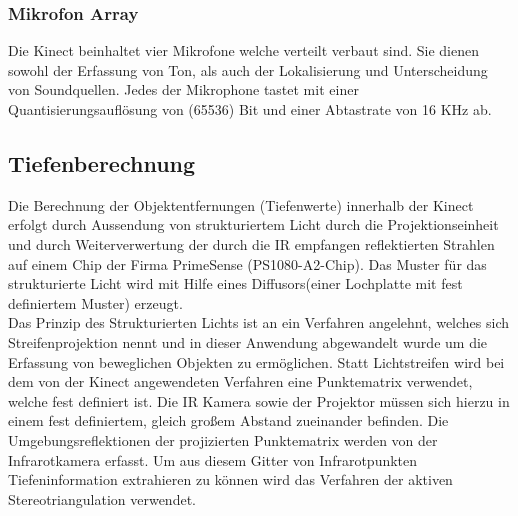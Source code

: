 \subsubsection{Mikrofon Array}
Die Kinect beinhaltet vier Mikrofone welche verteilt verbaut sind. Sie dienen sowohl der Erfassung von Ton, als auch der Lokalisierung und Unterscheidung von Soundquellen. Jedes der Mikrophone tastet mit einer Quantisierungsauflösung von  (65536) Bit und einer Abtastrate von 16 KHz ab.

\subsection{Tiefenberechnung}

Die Berechnung der Objektentfernungen (Tiefenwerte) innerhalb der Kinect erfolgt durch Aussendung von strukturiertem Licht durch die Projektionseinheit und durch Weiterverwertung  der durch die IR empfangen reflektierten Strahlen auf einem Chip der Firma PrimeSense (PS1080-A2-Chip). Das Muster für das strukturierte Licht wird mit Hilfe eines Diffusors(einer Lochplatte mit fest definiertem Muster) erzeugt.\\
Das Prinzip des Strukturierten Lichts ist an ein Verfahren angelehnt, welches sich Streifenprojektion nennt und in dieser Anwendung abgewandelt wurde um die Erfassung von beweglichen Objekten zu ermöglichen. Statt Lichtstreifen wird bei dem von der Kinect angewendeten Verfahren eine Punktematrix verwendet, welche fest definiert ist. Die IR Kamera sowie der Projektor müssen sich hierzu in einem fest definiertem, gleich großem Abstand zueinander befinden.
Die Umgebungsreflektionen der projizierten Punktematrix werden von der Infrarotkamera erfasst.
Um aus diesem Gitter von Infrarotpunkten Tiefeninformation extrahieren zu können wird das Verfahren der aktiven Stereotriangulation verwendet.\\


